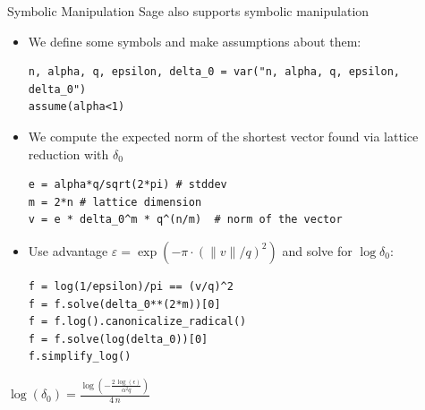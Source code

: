 \documentclass[presentation,smaller]{beamer}
\begin{document}
\begin{frame}{Symbolic Manipulation}
 Sage also supports symbolic manipulation

\begin{itemize}
\item We define some symbols and make assumptions about them:

\lstset{language=sage,label= ,caption= ,captionpos=b,numbers=none}
\begin{lstlisting}
n, alpha, q, epsilon, delta_0 = var("n, alpha, q, epsilon, delta_0")
assume(alpha<1)
\end{lstlisting}

\item We compute the expected norm of the shortest vector found via lattice reduction with \(δ_0\)

\lstset{language=sage,label= ,caption= ,captionpos=b,numbers=none}
\begin{lstlisting}
e = alpha*q/sqrt(2*pi) # stddev
m = 2*n # lattice dimension
v = e * delta_0^m * q^(n/m)  # norm of the vector
\end{lstlisting}

\framebreak

\item Use advantage  \(ε = \exp\left(-π⋅(\|v\|/q)^2\right)\) and solve for \(\log δ_0\):

\lstset{language=sage,label= ,caption= ,captionpos=b,numbers=none}
\begin{lstlisting}
f = log(1/epsilon)/pi == (v/q)^2
f = f.solve(delta_0**(2*m))[0]
f = f.log().canonicalize_radical()
f = f.solve(log(delta_0))[0]
f.simplify_log()
\end{lstlisting}
\end{itemize}

\begin{center}
\(\log\left(\delta_{0}\right) = \frac{\log\left(-\frac{2 \, \log\left(\epsilon\right)}{\alpha^{2} q}\right)}{4 \, n}\)
\end{center}
\end{frame}
\end{document}
